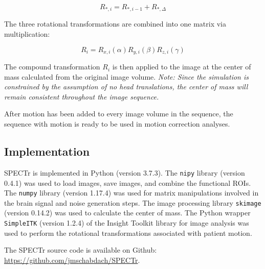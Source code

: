 \begin{equation}
R_{*,i} = R_{*,i-1} + R_{*,\Delta}
\end{equation}

The three rotational transformations are combined into one matrix via multiplication: 

\begin{equation}
R_i = R_{x, i}(\alpha) R_{y,i}(\beta) R_{z,i}(\gamma)
\end{equation}

The compound transformation $R_i$ is then applied to the image at the center of mass calculated from the original image volume. \textit{Note: Since the simulation is constrained by the assumption of no head translations, the center of mass will remain consistent throughout the image sequence.}

After motion has been added to every image volume in the sequence, the sequence with motion is ready to be used in motion correction analyses.

\subsection{Implementation}

SPECTr is implemented in Python (version 3.7.3). The \lstinline{nipy} library (version 0.4.1) was used to load images, save images, and combine the functional ROIs. The \lstinline{numpy} library (version 1.17.4) was used for matrix manipulations involved in the brain signal and noise generation steps. The image processing library \lstinline{skimage} (version 0.14.2) was used to calculate the center of mass. The Python wrapper \lstinline{SimpleITK} (version 1.2.4) of the Insight Toolkit library for image analysis was used to perform the rotational transformations associated with patient motion.

The SPECTr source code is available on Github: \url{https://github.com/jmschabdach/SPECTr}.



